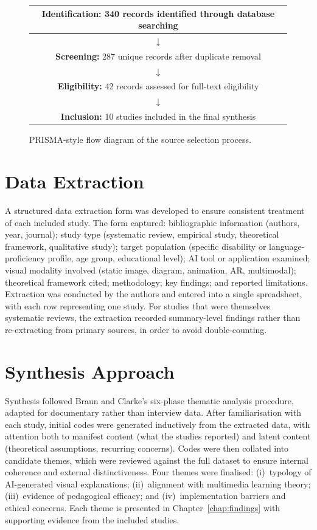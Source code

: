 \begin{figure}[H]
\centering
\begin{tabular}{|c|}
\hline
\textbf{Identification:} 340 records identified through database searching \\
\hline
$\downarrow$ \\
\hline
\textbf{Screening:} 287 unique records after duplicate removal \\
\hline
$\downarrow$ \\
\hline
\textbf{Eligibility:} 42 records assessed for full-text eligibility \\
\hline
$\downarrow$ \\
\hline
\textbf{Inclusion:} 10 studies included in the final synthesis \\
\hline
\end{tabular}
\caption{PRISMA-style flow diagram of the source selection process.}
\label{fig:prisma}
\end{figure}

\section{Data Extraction}

A structured data extraction form was developed to ensure consistent treatment of each included study. The form captured: bibliographic information (authors, year, journal); study type (systematic review, empirical study, theoretical framework, qualitative study); target population (specific disability or language-proficiency profile, age group, educational level); AI tool or application examined; visual modality involved (static image, diagram, animation, AR, multimodal); theoretical framework cited; methodology; key findings; and reported limitations. Extraction was conducted by the authors and entered into a single spreadsheet, with each row representing one study. For studies that were themselves systematic reviews, the extraction recorded summary-level findings rather than re-extracting from primary sources, in order to avoid double-counting.

\section{Synthesis Approach}

Synthesis followed Braun and Clarke's six-phase thematic analysis procedure, adapted for documentary rather than interview data. After familiarisation with each study, initial codes were generated inductively from the extracted data, with attention both to manifest content (what the studies reported) and latent content (theoretical assumptions, recurring concerns). Codes were then collated into candidate themes, which were reviewed against the full dataset to ensure internal coherence and external distinctiveness. Four themes were finalised: (i)~typology of AI-generated visual explanations; (ii)~alignment with multimedia learning theory; (iii)~evidence of pedagogical efficacy; and (iv)~implementation barriers and ethical concerns. Each theme is presented in Chapter~\ref{chap:findings} with supporting evidence from the included studies.

